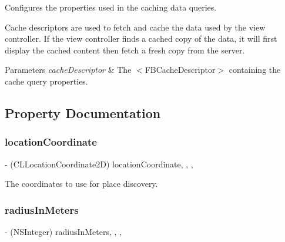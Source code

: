 Configures the properties used in the caching data queries.

Cache descriptors are used to fetch and cache the data used by the view controller. If the view controller finds a cached copy of the data, it will first display the cached content then fetch a fresh copy from the server.


\begin{DoxyParams}{Parameters}
{\em cache\+Descriptor} & The $<$\+F\+B\+Cache\+Descriptor$>$ containing the cache query properties. \\
\hline
\end{DoxyParams}


\subsection{Property Documentation}
\mbox{\label{interfaceFBPlacePickerViewController_a67ede6488ef520c82a4bea945cffae0b}} 
\subsubsection{\texorpdfstring{location\+Coordinate}{locationCoordinate}}
{\footnotesize\ttfamily -\/ (C\+L\+Location\+Coordinate2D) location\+Coordinate\hspace{0.3cm}{\ttfamily [read]}, {\ttfamily [write]}, {\ttfamily [nonatomic]}, {\ttfamily [assign]}}

The coordinates to use for place discovery. \mbox{\label{interfaceFBPlacePickerViewController_ae0a9e348ccf057d2d307263bde87d496}} 
\subsubsection{\texorpdfstring{radius\+In\+Meters}{radiusInMeters}}
{\footnotesize\ttfamily -\/ (N\+S\+Integer) radius\+In\+Meters\hspace{0.3cm}{\ttfamily [read]}, {\ttfamily [write]}, {\ttfamily [nonatomic]}, {\ttfamily [assign]}}

